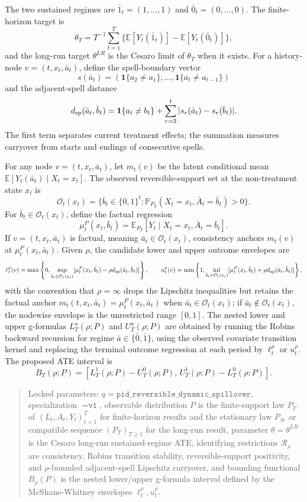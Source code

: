 \documentclass[11pt]{article}
\newcommand{\E}{\mathbb{E}}
\renewcommand{\Pr}{\mathbb{P}}
\newcommand{\one}{\mathbf{1}}
\theoremstyle{definition}
\theoremstyle{plain}
\theoremstyle{remark}
\begin{document}
The two sustained regimes are \(\bar 1_t=(1,\ldots,1)\) and
\(\bar 0_t=(0,\ldots,0)\).  The finite-horizon target is
\[
\theta_T=T^{-1}\sum_{t=1}^T
\{\E[Y_t(\bar 1_t)]-\E[Y_t(\bar 0_t)]\},
\]
and the long-run target \(\theta^{LR}\) is the Cesaro limit of \(\theta_T\)
when it exists.  For a history-node \(v=(t,x_t,\bar a_t)\), define the
spell-boundary vector
\[
s(\bar a_t)=(\one\{a_2\ne a_1\},\ldots,\one\{a_t\ne a_{t-1}\})
\]
and the adjacent-spell distance
\[
d_{\rm sp}(\bar a_t,\bar b_t)
=\one\{a_t\ne b_t\}+\sum_{r=2}^t |s_r(\bar a_t)-s_r(\bar b_t)|.
\]
The first term separates current treatment effects; the summation measures
carryover from starts and endings of consecutive spells.

For any node \(v=(t,x_t,\bar a_t)\), let \(m_t(v)\) be the latent conditional
mean \(\E[Y_t(\bar a_t)\mid X_t=x_t]\).  The observed reversible-support set at
the non-treatment state \(x_t\) is
\[
\mathcal O_t(x_t)=
\{\bar b_t\in\{0,1\}^t:\Pr_{P_T}(X_t=x_t,\bar A_t=\bar b_t)>0\}.
\]
For \(\bar b_t\in\mathcal O_t(x_t)\), define the factual regression
\[
\mu_t^P(x_t,\bar b_t)=\E_{P_T}[Y_t\mid X_t=x_t,\bar A_t=\bar b_t].
\]
If \(v=(t,x_t,\bar a_t)\) is factual, meaning
\(\bar a_t\in\mathcal O_t(x_t)\), consistency anchors \(m_t(v)\) at
\(\mu_t^P(x_t,\bar a_t)\).  Given \(\rho\), the
candidate lower and upper outcome envelopes are
\[
\ell_t^\rho(v)=
\max\left\{0,\sup_{\bar b_t\in\mathcal O_t(x_t)}
[\mu_t^P(x_t,\bar b_t)-\rho d_{\rm sp}(\bar a_t,\bar b_t)]\right\},
\qquad
u_t^\rho(v)=
\min\left\{1,\inf_{\bar b_t\in\mathcal O_t(x_t)}
[\mu_t^P(x_t,\bar b_t)+\rho d_{\rm sp}(\bar a_t,\bar b_t)]\right\},
\]
with the convention that \(\rho=\infty\) drops the Lipschitz inequalities but
retains the factual anchor \(m_t(t,x_t,\bar a_t)=\mu_t^P(x_t,\bar a_t)\) when
\(\bar a_t\in\mathcal O_t(x_t)\); if \(\bar a_t\notin\mathcal O_t(x_t)\), the
nodewise envelope is the unrestricted range \([0,1]\).
The nested lower and upper g-formulas \(L_T^a(\rho;P)\) and \(U_T^a(\rho;P)\)
are obtained by running the Robins backward recursion for regime
\(\bar a\in\{\bar 0,\bar 1\}\), using the observed covariate transition kernel
and replacing the terminal outcome regression at each period by
\(\ell_t^\rho\) or \(u_t^\rho\).  The proposed ATE interval is
\[
B_T(\rho;P)=
[L_T^1(\rho;P)-U_T^0(\rho;P),\,
 U_T^1(\rho;P)-L_T^0(\rho;P)].
\]

\begin{quote}
Locked parameters: \(q=\texttt{pid\_reversible\_dynamic\_spillover}\),
specialization \(=\texttt{v1}\), observable distribution \(P\) is the
finite-support law \(P_T\) of \((L_t,A_t,Y_t)_{t=1}^T\) for finite-horizon
results and the stationary law \(P_\infty\) or compatible sequence
\((P_T)_{T\ge1}\) for the long-run result, parameter
\(\theta=\theta^{LR}\) is the Cesaro long-run sustained-regime ATE, identifying
restrictions \(\mathcal R_\rho\) are consistency, Robins transition stability,
reversible-support positivity, and \(\rho\)-bounded adjacent-spell Lipschitz
carryover, and bounding functional \(B_\rho(P)\) is the nested lower/upper
g-formula interval defined by the McShane-Whitney envelopes
\(\ell_t^\rho,u_t^\rho\).
\end{quote}
\end{document}
